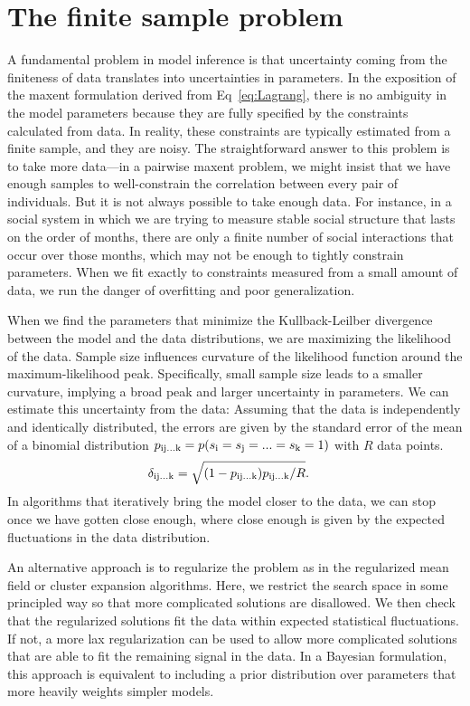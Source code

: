 \documentclass[aps,prl,twocolumn,nofootinbib]{revtex4-1}
\begin{document}
\section{The finite sample problem}
A fundamental problem in model inference is that uncertainty coming
from the finiteness of data translates into uncertainties in parameters.
In the exposition of the maxent formulation derived from Eq~\ref{eq:Lagrang}, there is no ambiguity in the model parameters because they are fully specified by the constraints calculated from data. In reality, these constraints are typically estimated from a finite sample, and they are noisy.
The straightforward answer to this problem is to take more data---in a pairwise
maxent problem, we might insist that we have enough samples to well-constrain
the correlation between every pair of individuals.  But it is not always possible
to take enough data.  For instance, in a social system in which we are trying to
measure stable social structure that lasts on the order of months, there are only
a finite number of social interactions that occur over those months, which may
not be enough to tightly constrain parameters. When we fit exactly to constraints measured from a small amount of data, we run the danger of overfitting and poor generalization.

When we find the parameters that minimize the Kullback-Leilber divergence between the model and the data distributions, we are maximizing the likelihood of the data. 
Sample size influences curvature of the likelihood function around the maximum-likelihood peak.  Specifically, small sample size leads to a smaller curvature, implying a broad peak and larger uncertainty in parameters.
We can estimate this uncertainty from the data: Assuming that the data is independently and identically distributed, the errors are given by the standard error of the mean of a binomial distribution \mbox{$p_{\rm ij...k} = p(s_{\rm i}=s_{\rm j}=...=s_{\rm k}=1)$} with $R$ data points.
\begin{align}
	\delta_{\rm ij...k} &= \sqrt{(1-p_{\rm ij...k})p_{\rm ij...k}/R}.
\end{align}
In algorithms that iteratively bring the model closer to the data, we can stop once we have gotten close enough, where close enough is given by the expected fluctuations in the data distribution.

An alternative approach is to regularize the problem as in the regularized mean field or cluster expansion algorithms. Here, we restrict the search space in some principled way so that more complicated
solutions are disallowed.  We then check that the regularized solutions fit the
data within expected statistical fluctuations.  If not, a more lax regularization
can be used to allow more complicated solutions that are able to fit the
remaining signal in the data. 
In a Bayesian formulation, this approach is equivalent to including a prior distribution over  parameters that more heavily weights simpler models.
\end{document}
